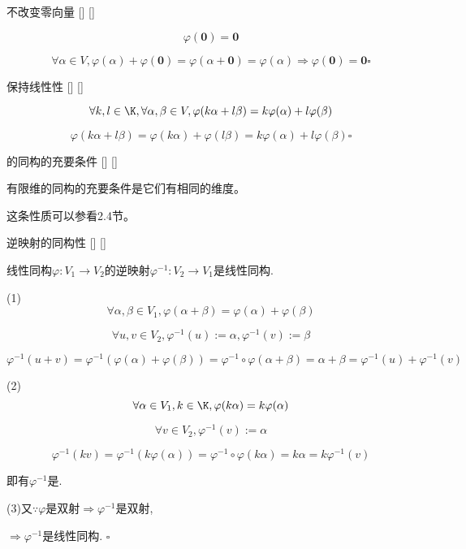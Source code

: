 \documentclass[UTF8]{ctexart}
\begin{document}
		\begin{ppt}
			[]
			{ 不改变零向量}
			[]
			[]

			$$\varphi(\mathbf{0})=\mathbf{0}$$
		\end{ppt}
  
		\begin{prf}
			
			$$\forall\alpha\in V, \varphi(\alpha)+\varphi(\mathbf{0})=\varphi(\alpha+\mathbf{0})=\varphi(\alpha)\Longrightarrow\varphi(\mathbf{0})=\mathbf{0}\square$$
		\end{prf}
  
		\begin{ppt}
			[]
			{ 保持线性性}
			[]
			[]

			$$\forall k,l\in\K, \forall \alpha, \beta\in V, \varphi(k\alpha+l\beta)=k\varphi(\alpha)+l\varphi(\beta)$$
		\end{ppt}
  
		\begin{prf}
			\[\varphi(k\alpha+l\beta)=\varphi(k\alpha)+\varphi(l\beta)=k\varphi(\alpha)+l\varphi(\beta)\square\]
		\end{prf}

		\begin{ppt}
			[]
			{ 的同构的充要条件}
			[]
			[]

			有限维 的同构的充要条件是它们有相同的维度。
		\end{ppt}

		这条性质可以参看2.4节。
  
		\begin{ppt}
			[]
			{逆映射的同构性}
			[]
			[]

			线性同构$\varphi:V_1\to V_2$的逆映射$\varphi^{-1}:V_2\to V_1$是线性同构. 
		\end{ppt}
  
		\begin{prf}
			(1)$$\forall\alpha,\beta\in V_1, \varphi(\alpha+\beta)=\varphi(\alpha)+\varphi(\beta)$$
			
			$$\forall u,v\in V_2, \varphi^{-1}(u):=\alpha,\varphi^{-1}(v):=\beta$$
			
			$$\varphi^{-1}(u+v)=\varphi^{-1}(\varphi(\alpha)+\varphi(\beta))=\varphi^{-1}\circ\varphi(\alpha+\beta)=\alpha+\beta=\varphi^{-1}(u)+\varphi^{-1}(v)$$
			
			(2)$$\forall\alpha\in V_1,k\in\K,\varphi(k\alpha)=k\varphi(\alpha)$$
			
			$$\forall v\in V_2, \varphi^{-1}(v):=\alpha$$ 
			
			$$\varphi^{-1}(kv)=\varphi^{-1}(k\varphi(\alpha))=\varphi^{-1}\circ\varphi(k\alpha)=k\alpha=k\varphi^{-1}(v)$$
			
			即有$\varphi^{-1}$是. 
			
			(3)又$\because\varphi$是双射$\Longrightarrow\varphi^{-1}$是双射, 
			
			$\Longrightarrow\varphi^{-1}$是线性同构. $\square$
		\end{prf}
  
\end{document}
